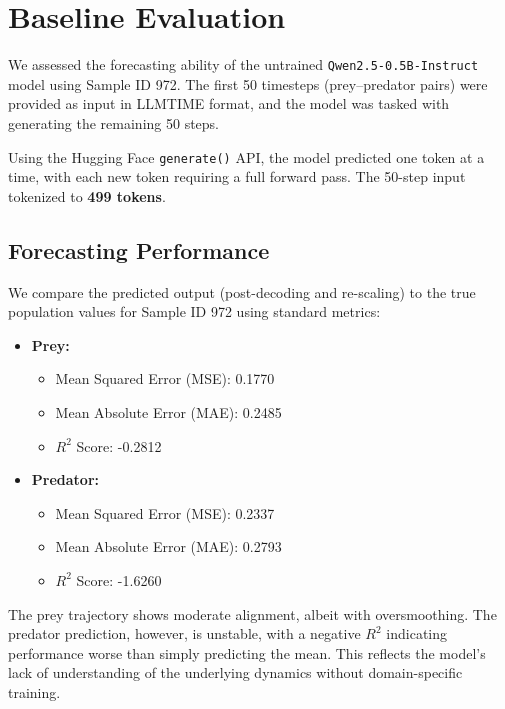 \documentclass[a4paper,12pt]{article}
\begin{document}
  
\section{Baseline Evaluation}

We assessed the forecasting ability of the untrained \texttt{Qwen2.5-0.5B-Instruct} model using Sample ID 972. The first 50 timesteps (prey–predator pairs) were provided as input in LLMTIME format, and the model was tasked with generating the remaining 50 steps.


Using the Hugging Face \texttt{generate()} API, the model predicted one token at a time, with each new token requiring a full forward pass. The 50-step input tokenized to \textbf{499 tokens}.

  \subsection*{Forecasting Performance}
  
  We compare the predicted output (post-decoding and re-scaling) to the true population values for Sample ID 972 using standard metrics:
  
  \begin{itemize}
    \item \textbf{Prey:}
      \begin{itemize}
        \item Mean Squared Error (MSE): 0.1770
        \item Mean Absolute Error (MAE): 0.2485
        \item $R^2$ Score: -0.2812
      \end{itemize}
    \item \textbf{Predator:}
      \begin{itemize}
        \item Mean Squared Error (MSE): 0.2337
        \item Mean Absolute Error (MAE): 0.2793
        \item $R^2$ Score: -1.6260
      \end{itemize}
  \end{itemize}
  
  The prey trajectory shows moderate alignment, albeit with oversmoothing. The predator prediction, however, is unstable, with a negative $R^2$ indicating performance worse than simply predicting the mean. This reflects the model’s lack of understanding of the underlying dynamics without domain-specific training.
  
\end{document}
